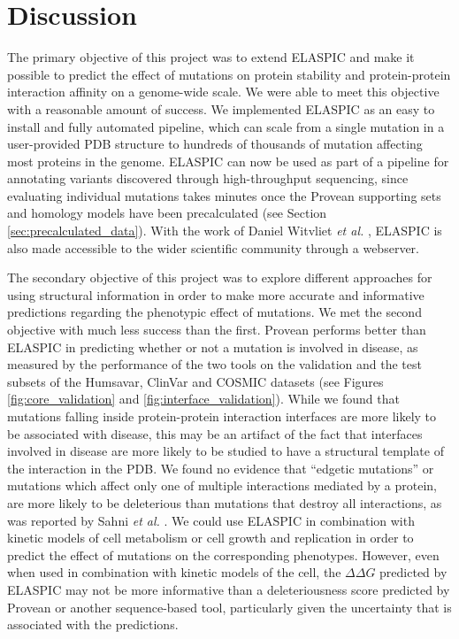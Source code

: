 
\chapter{Discussion} \label{ch:discussion}

The primary objective of this project was to extend ELASPIC and make it possible to predict the effect of mutations on protein stability and protein-protein interaction affinity on a genome-wide scale. We were able to meet this objective with a reasonable amount of success. We implemented ELASPIC as an easy to install and fully automated pipeline, which can scale from a single mutation in a user-provided PDB structure to hundreds of thousands of mutation affecting most proteins in the genome. ELASPIC can now be used as part of a pipeline for annotating variants discovered through high-throughput sequencing, since evaluating individual mutations takes minutes once the Provean supporting sets and homology models have been precalculated (see Section \ref{sec:precalculated_data}). With the work of Daniel Witvliet \textit{et al.} \cite{witvliet_elaspic_2016}, ELASPIC is also made accessible to the wider scientific community through a webserver.

The secondary objective of this project was to explore different approaches for using structural information in order to make more accurate and informative predictions regarding the phenotypic effect of mutations. We met the second objective with much less success than the first. Provean performs better than ELASPIC in predicting whether or not a mutation is involved in disease, as measured by the performance of the two tools on the validation and the test subsets of the Humsavar, ClinVar and COSMIC datasets (see Figures \ref{fig:core_validation} and \ref{fig:interface_validation}). While we found that mutations falling inside protein-protein interaction interfaces are more likely to be associated with disease, this may be an artifact of the fact that interfaces involved in disease are more likely to be studied to have a structural template of the interaction in the PDB. We found no evidence that ``edgetic mutations'' or mutations which affect only one of multiple interactions mediated by a protein, are more likely to be deleterious than mutations that destroy all interactions, as was reported by Sahni \textit{et al.} \cite{sahni_widespread_2015}.
We could use ELASPIC in combination with kinetic models of cell metabolism or cell growth and replication \cite{karr_whole-cell_2012} in order to predict the effect of mutations on the corresponding phenotypes. However, even when used in combination with kinetic models of the cell, the $\Delta \Delta G$ predicted by ELASPIC may not be more informative than a deleteriousness score predicted by Provean or another sequence-based tool, particularly given the uncertainty that is associated with the predictions.

